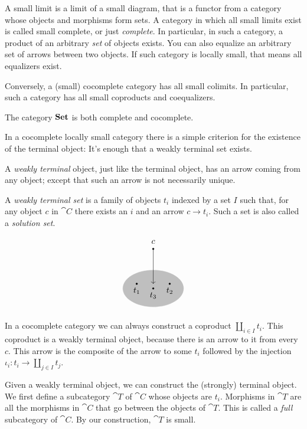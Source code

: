 \documentclass[DaoFP]{subfiles}
\begin{document}
A small limit is a limit of a small diagram, that is a functor from a category whose objects and morphisms form sets. A category in which all small limits exist is called small complete, or just \emph{complete}. In particular, in such a category, a product of an arbitrary \emph{set} of objects exists. You can also equalize an arbitrary set of arrows between two objects. If such category is locally small, that means all equalizers exist.

Conversely, a (small) cocomplete category has all small colimits. In particular, such a category has all small coproducts and coequalizers.

The category $\mathbf{Set}$ is both complete and cocomplete. 


In a cocomplete locally small category there is a simple criterion for the existence of the terminal object: It's enough that a weakly terminal set exists. 

A \emph{weakly terminal} object, just like the terminal object, has an arrow coming from any object; except that such an arrow is not necessarily unique. 

A \emph{weakly terminal set} is a family of objects $t_i$ indexed by a set $I$ such that, for any object $c$ in $\cat C$ there exists an $i$ and an arrow $c \to t_i$. Such a set is also called a \emph{solution set}.

\[
\begin{tikzpicture}
        \filldraw (0, 1.5) circle (1pt);
        \node at (0, 1.8) {$c$};
        
\filldraw[fill=gray!50, draw=white] (0, -0.2) ellipse (1.3 and 0.8);
        \filldraw (-0.7, 0) circle (1pt);
        \node at (-0.7, -0.3) {$t_1$};
        \filldraw (0.7, 0) circle (1pt);
        \node at (0.7, -0.3) {$t_2$};
        \filldraw (0, -0.2) circle (1pt);
        \node at (0, -0.5) {$t_3$};
        
    	\draw[->] (0, 1.5) -- (0, 0);
\end{tikzpicture}
\]

In a cocomplete category we can always construct a coproduct $\coprod_{i \in I} t_i$. This coproduct is a weakly terminal object, because there is an arrow to it from every $c$. This arrow is the composite of the arrow to some $t_i$ followed by the injection $\iota_i \colon t_i \to \coprod_{j \in I} t_j$.

Given a weakly terminal object, we can construct the (strongly) terminal object. We first define a subcategory $\cat T$ of $\cat C$ whose objects are $t_i$. Morphisms in $\cat T$ are all the morphisms in $\cat C$ that go between the objects of $\cat T$. This is called a \emph{full} subcategory of $\cat C$. By our construction, $\cat T$ is small.
\end{document}
